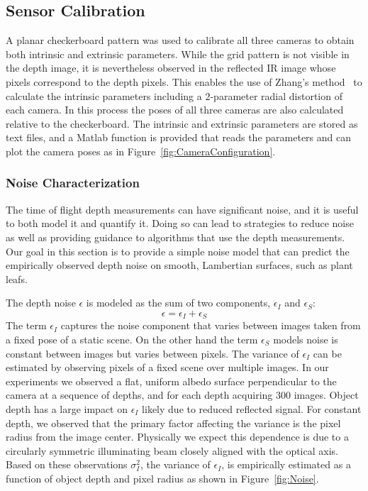 

\subsection{Sensor Calibration}

A planar checkerboard pattern was used to calibrate all three cameras to obtain both intrinsic and extrinsic parameters. While the grid pattern is not visible in the depth image, it is nevertheless observed in the reflected IR image whose pixels correspond to the depth pixels. This enables the use of Zhang's method~\cite{Zhang2000} to calculate the intrinsic parameters including a $2$-parameter radial distortion of each camera. In this process the poses of all three cameras are also calculated relative to the checkerboard. The intrinsic and extrinsic parameters are stored as text files, and a Matlab function is provided that reads the parameters and can plot the camera poses as in Figure~\ref{fig:CameraConfiguration}.


\subsubsection{Noise Characterization}
\label{sec:bias}

The time of flight depth measurements can have significant noise, and it is useful to both model it and quantify it. Doing so can lead to strategies to reduce noise as well as providing guidance to algorithms that use the depth measurements. Our goal in this section is to provide a simple noise model that can predict the empirically observed depth noise on smooth, Lambertian surfaces, such as plant leafs.

The depth noise $\epsilon$ is modeled as the sum of two components, $\epsilon_I$ and $\epsilon_S$:
\begin{equation}
\epsilon = \epsilon_I + \epsilon_S\label{eq:epsilon}
\end{equation}
The term $\epsilon_I$ captures the noise component that varies between images taken from a fixed pose of a static scene. On the other hand the term $\epsilon_S$ models noise is constant between images but varies between pixels. The variance of $\epsilon_I$ can be estimated by observing pixels of a fixed scene over multiple images. In our experiments we observed a flat, uniform albedo surface perpendicular to the camera at a sequence of depths, and for each depth acquiring 300 images. Object depth has a large impact on $\epsilon_I$ likely due to reduced reflected signal. For constant depth, we observed that the primary factor affecting the variance is the pixel radius from the image center. Physically we expect this dependence is due to a circularly symmetric illuminating beam closely aligned with the optical axis. Based on these observations $\sigma_I^2$, the variance of $\epsilon_I$, is empirically estimated as a function of object depth and pixel radius as shown in Figure~\ref{fig:Noise}.


